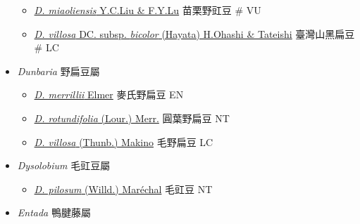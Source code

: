 \begin{itemize}
  \begin{itemize}
        \item[] \href{http://www.theplantlist.org/tpl1.1/search?q=Dumasia+miaoliensis}{\textit{D. miaoliensis} Y.C.Liu \& F.Y.Lu}   苗栗野豇豆  \# VU
        \item[] \href{http://www.theplantlist.org/tpl1.1/search?q=Dumasia+villosa+subsp.+bicolor}{\textit{D. villosa} DC. subsp. \textit{bicolor} (Hayata) H.Ohashi \& Tateishi}   臺灣山黑扁豆  \# LC
  \end{itemize}
 \item[] \textit{Dunbaria} 野扁豆屬
                                
  \begin{itemize}
        \item[] \href{http://www.theplantlist.org/tpl1.1/search?q=Dunbaria+merrillii}{\textit{D. merrillii} Elmer}   麥氏野扁豆   EN
        \item[] \href{http://www.theplantlist.org/tpl1.1/search?q=Dunbaria+rotundifolia}{\textit{D. rotundifolia} (Lour.) Merr.}   圓葉野扁豆   NT
        \item[] \href{http://www.theplantlist.org/tpl1.1/search?q=Dunbaria+villosa}{\textit{D. villosa} (Thunb.) Makino}   毛野扁豆   LC
  \end{itemize}
 \item[] \textit{Dysolobium} 毛豇豆屬
                                
  \begin{itemize}
        \item[] \href{http://www.theplantlist.org/tpl1.1/search?q=Dysolobium+pilosum}{\textit{D. pilosum} (Willd.) Maréchal}   毛豇豆   NT
  \end{itemize}
 \item[] \textit{Entada} 鴨腱藤屬
                                

\end{itemize}
